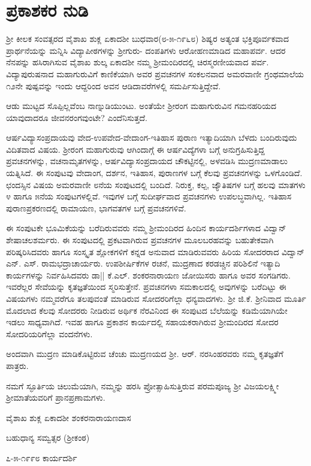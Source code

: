 
\chapter{ಪ್ರಕಾಶಕರ ನುಡಿ}
ಶ್ರೀ ಕೀಲಕ ಸಂವತ್ಸರದ ವೈಶಾಖ ಶುಕ್ಲ ಏಕಾದಶೀ ಬುಧವಾರ(೮-೫-೧೯೬೮) ಶಿಷ್ಯರ ಅತ್ಯಂತ ಭಕ್ತಿಪೂರ್ವಕವಾದ ಪ್ರಾರ್ಥನೆಯನ್ನು ಮನ್ನಿಸಿ ವಿದ್ಯಾಪೀಠಗಳನ್ನು  ಶ್ರೀಗುರು- ದಂಪತಿಗಳು ಆರೋಹಣಮಾಡಿದ ಮಹಾಪರ್ವ. ಆದರ ನೆನಪನ್ನು ಹಸಿರಾಗಿಸುವ ವೈಶಾಖ ಶುಲ್ಕ ಏಕಾದಶೀ ನಮ್ಮ ಶ್ರೀಮಂದಿರದಲ್ಲಿ ಚಿರಸ್ಮರಣೀಯವಾದ ಪರ್ವ. ವಿದ್ಯಾಪುರುಷನಾದ ಮಹಾಗುರುವಿಗೆ ಕಾಣಿಕೆಯಾಗಿ ಅವರ ಪ್ರವಚನಗಳ ಸಂಕಲನವಾದ ಅಮರವಾಣೀ ಗ್ರಂಥಮಾಲೆಯ ೧೨ನೇ ಪುಷ್ಪವನ್ನು ಇಂದು ಆದ್ದರಿಂದ ಅವನ ಆಡಿದಾವರೆಗಳಲ್ಲಿ ಸಮರ್ಪಿಸುತ್ತಿದ್ದೇವೆ.

ಆಡು ಮುಟ್ಟದ ಸೊಪ್ಪಿಲ್ಲವೆಂಬ ನಾಣ್ನುಡಿಯುಂಟು. ಅಂತೆಯೇ ಶ್ರೀರಂಗ ಮಹಾಗುರುವಿನ ಗಮನಹರಿಯದ ಯಾವುದಾದರೂ ಜೀವನರಂಗವುಂಟೇ? ಎಂದೆನಿಸುತ್ತದೆ.

ಆರ್ಷವಿದ್ಯಾಸಂಪ್ರದಾಯವು ವೇದ-ಉಪವೇದ-ವೇದಾಂಗ-ಇತಿಹಾಸ ಪುರಾಣ ಇತ್ಯಾದಿಯಾಗಿ ಬೆಳದು ಬಂದಿರುವುದು ವಿದಿತವಾದ ವಿಷಯ. ಶ್ರೀರಂಗ ಮಹಾಗುರುವು ಆಗಿಂದಾಗ್ಗೆ ಈ ಆರ್ಷವಿದ್ಯೆಗಳಾ ಬಗ್ಗೆ ಅನುಗ್ರಹಿಸುತ್ತಿದ್ದ ಪ್ರವಚನಗಳನ್ನು, ವಚನಾಮೃತಗಳನ್ನು, ಆರ್ಷವಿದ್ಯಾಸಂಪ್ರದಾಯದ ಚೌಕಟ್ಟಿನಲ್ಲಿ, ಅಳವಡಿಸಿ ಮುದ್ರಣಮಾಡಾಲು ಯತ್ನಿಸಿದೆ. ಈ ಸಂಪುಟವು ವೇದಾಂಗ, ದರ್ಶನ, ಇತಿಹಾಸ, ಪುರಾಣಗಳ ಬಗ್ಗೆ ಕೆಲವು ಪ್ರವಚನಗಳನ್ನು ಒಳಗೊಂಡಿದೆ. ಛಂದಸ್ಸಿನ ವಿಷಯ ಅಮರವಾಣೀ ೮ನೆಯ ಸಂಪುಟದಲ್ಲಿ ಬಂದಿದೆ. ನಿರುಕ್ತ, ಕಲ್ಪ, ಜ್ಯೌತಿಷಗಳ ಬಗ್ಗೆ ಹಲವು ಮಾತಗಳು ೪ ಹಾಗೂ ೫ನೆಯ ಸಂಪುಟಗಳಲ್ಲಿವೆ. ಇವುಗಳ ಬಗ್ಗೆ ಸುದೀರ್ಘವಾದ ಪ್ರವಚನಗಳು ಉಪಲಬ್ಧವಾಗಿಲ್ಲ. ಇತಿಹಾಸ ಪುರಾಣಪ್ರಕರಣದಲ್ಲಿ ರಾಮಾಯಣ, ಭಾಗವತಗಳ ಬಗ್ಗೆ ಪ್ರವಚನಗಳಿವೆ.

ಈ ಸಂಪುಟಕೇ ಭೂಮಿಕೆಯನ್ನು ಬರೆದಿರುವವರು ನಮ್ಮ ಶ್ರೀಮಂದಿರದ ಹಿಂದಿನ ಕಾರ್ಯದರ್ಶಿಗಳಾದ ವಿದ್ವಾನ್ ಶೇಷಾಚಲಶರ್ಮರು. ಈ ಸಂಪುಟದಲ್ಲಿ ಪ್ರಕಟವಾಗಿರುವ ಪ್ರವಚನಗಳ ಮೂಲಬರಹವನ್ನು ಬಹುತೇಕವಾಗಿ ಪರಿಷ್ಕರಿಸಿದವರು ಹಾಗೂ ಸಂಸ್ಕೃತ ಶ್ಲೋಕಗಳಿಗೆ ಕನ್ನಡ ಅನುವಾದ ಮಾಡಿರುವವರು ಹಿರಿಯ ಸೋದರರಾದ ವಿದ್ವಾನ್ ಎನ್. ಎಸ್. ರಾಮಭದ್ರಾಚಾರ್ಯರು. ಉಪಶೀರ್ಷಿಕೆಗಳ ರಚನೆ, ಮುದ್ರಣಾದ ಕರಡಚ್ಚಿನ ಪರಿಶಿಲಿನೆ ಇತ್ಯಾದಿ ಕಾರ್ಯಗಳನ್ನು ನಿರ್ವಹಿಸಿದವರು ಡಾ|| ಕೆ.ಎಲ್. ಶಂಕರನಾರಾಯಣ ಜೋಯಿಸರು ಹಾಗೂ ಅವರ ಸಂಗಡಿಗರು. ಇವರೆಲ್ಲರ ಸೇವೆಯನ್ನು ಕೃತಜ್ಞತೆಯಿಂದ ಸ್ಮರಿಸುತ್ತೇನೆ.
ಪ್ರವಚನಗಳಾ ಸಮಕಾಲದಲ್ಲಿ ಅವುಗಳನ್ನು ಬರೆದಿಟ್ಟು ಈ ವಿಷಯಗಳು ನಮ್ಮವರೆಗೂ ತಲಪುವಂತೆ ಮಾಡಿರುವ ಸೋದರರಿಗೆಲ್ಲಾ ಧನ್ಯವಾದಗಳು. ಶ್ರೀ ಜಿ.ಕೆ. ಶ್ರೀನಿವಾದ ಮೂರ್ತಿ ಮೊದಲಾದ ಕೆಲವು ಸೋದರರು ನೀಡಿರುವ ಅರ್ಥಿಕ ನೆರವಿನಿಂದ ಈ ಸಂಪುಟದ ಬೆಲೆಯನ್ನು ಕಡಿಮೆಯಾಗಿಯೇ ಇಡಲು ಸಾಧ್ಯವಾಗಿದೆ. ಇವಹ ಹಾಗೂ ಪ್ರಕಾಶನ ಕಾರ್ಯದಲ್ಲಿ ಸಹಾಯಕರಾಗಿರುವ ಶ್ರೀಮಂದಿರದ ಸೋದರ ಸೋದರಿಯರಿಗೆಲ್ಲಾ ವಂದನೆಗಳು.

ಅಂದವಾಗಿ ಮುದ್ರಣ ಮಾಡಿಕೊಟ್ಟಿರುವ ಚೆಂಚು ಮುದ್ರಣಯದ ಶ್ರೀ. ಆರ್. ನರಸಿಂಹರವರು ನಮ್ಮ ಕೃತಜ್ಞತೆಗೆ ಪಾತ್ರರು.

ನಮಗೆ ಸ್ಫೂರ್ತಿಯ ಚಿಲುಮೆಯಾಗಿ, ನಮ್ಮನ್ನು ಹರಸಿ ಪ್ರೋತ್ಸಾಹಿಸುತ್ತಿರುವ ಪರಮಪೂಜ್ಯ ಶ್ರೀ ವಿಜಯಲಕ್ಷ್ಮೀ ಶ್ರೀಮಾತೆಯವರಿಗೆ ಪ್ರಾನಪ್ರಣಾಮಗಳು.

ವೈಶಾಖ ಶುಕ್ಲ ಏಕಾದಶೀ \hfill  ಶಂಕರನಾರಾಯಣದಾಸ

ಬಹುಧಾನ್ಯ ಸಮ್ವತ್ಸರ \hfill (ಶ್ರೀಕಂಠ)

೭-೫-೧೯೯೮  \hfill ಕಾರ್ಯದರ್ಶಿ
